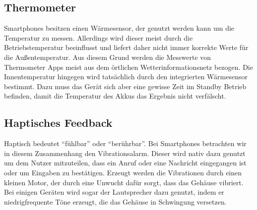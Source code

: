 \subsection*{Thermometer}
Smartphones besitzen einen Wärmesensor, der genutzt werden kann um die Temperatur zu messen. Allerdings wird dieser meist durch die Betriebstemperatur beeinflusst und liefert daher nicht immer korrekte Werte für die Außentemperatur. Aus diesem Grund werden die Messwerte von Thermometer Apps meist aus dem örtlichen Wetterinformationsnetz bezogen. 
Die Innentemperatur hingegen wird tatsächlich durch den integrierten Wärmesensor bestimmt. Dazu muss das Gerät sich aber eine gewisse Zeit im Standby Betrieb befinden, damit die Temperatur des Akkus das Ergebnis nicht verfälscht.

\subsection*{Haptisches Feedback}
Haptisch bedeutet “fühlbar” oder “berührbar”. Bei Smartphones betrachten wir in diesem Zusammenhang den Vibrationsalarm. Dieser wird nativ dazu genutzt um dem Nutzer mitzuteilen, dass ein Anruf oder eine Nachricht eingegangen ist oder um Eingaben zu bestätigen.
Erzeugt werden die Vibrationen durch einen kleinen Motor, der durch eine Unwucht dafür sorgt, dass das Gehäuse vibriert. Bei einigen Geräten wird sogar der Lautsprecher dazu genutzt, indem er niedrigfrequente Töne erzeugt, die das Gehäuse in Schwingung versetzen.
